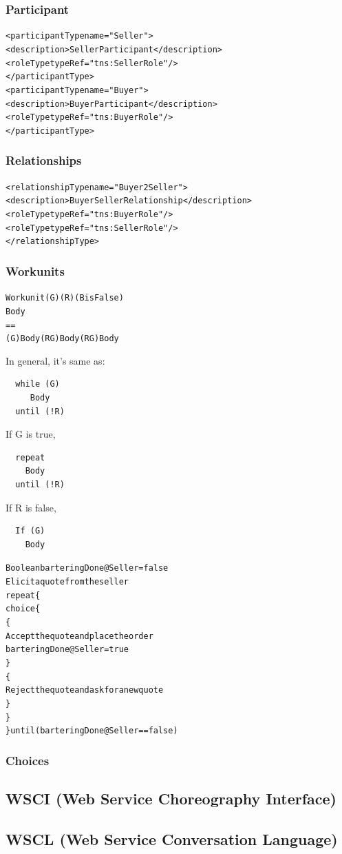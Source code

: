 \documentclass{note}
\begin{document}
\subsubsection{Participant}
\begin{alltt}
<participantType name="Seller">
     <description> Seller Participant </description>
    <roleType typeRef="tns:SellerRole"/>
</participantType>
<participantType name="Buyer">
    <description> Buyer Participant </description>
    <roleType typeRef="tns:BuyerRole"/>
</participantType>
\end{alltt}

\subsubsection{Relationships}
\begin{alltt}
<relationshipType name="Buyer2Seller">
    <description> Buyer Seller Relationship </description>
    <roleType typeRef="tns:BuyerRole"/>
    <roleType typeRef="tns:SellerRole"/>
</relationshipType>
\end{alltt}


\subsubsection{Workunits}
\begin{alltt}
  Workunit (G) (R) (B is False)
    Body
 ==
  (G) Body (R G) Body (R G) Body
\end{alltt}
\bit
\w In general, it's same as:
\begin{verbatim}
  while (G) 
     Body
  until (!R)
\end{verbatim}
\w If G is true, 
\begin{verbatim}
  repeat
    Body
  until (!R)
\end{verbatim}
\w If R is false, 
\begin{verbatim}
  If (G)
    Body
\end{verbatim}
\eit

\begin{alltt}
  Boolean barteringDone@Seller = false
  Elicit a quote from the seller
  repeat \{ 
    choice \{
      \{
        Accept the quote and place the order
        barteringDone@Seller = true
      \}
      \{
        Reject the quote and ask for a new quote
      \}
     \}
  \} until (barteringDone@Seller == false) 
\end{alltt}

\subsubsection{Choices}

\subsection{WSCI (Web Service Choreography Interface)}
\subsection{WSCL (Web Service Conversation Language)}
\end{document}
